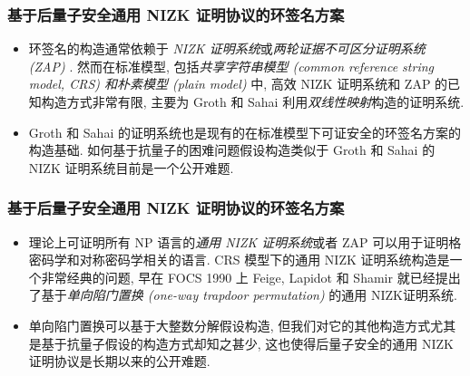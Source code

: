 \documentclass{beamer}
\begin{document}
\begin{frame}
    \frametitle{}

    \sectionpage

\end{frame}

\begin{frame}
    \frametitle{基于后量子安全通用 NIZK 证明协议的环签名方案}
    \begin{itemize}
        \item 环签名的构造通常依赖于 \emph{NIZK 证明系统}或\emph{两轮证据不可区分证明系统 (ZAP)} . 然而在标准模型, 包括\emph{共享字符串模型 (common reference string model, CRS) 和朴素模型 (plain model)} 中, 高效 NIZK 证明系统和 ZAP 的已知构造方式非常有限, 主要为 Groth 和 Sahai 利用\emph{双线性映射}构造的证明系统. 
        \item Groth 和 Sahai 的证明系统也是现有的在标准模型下可证安全的环签名方案的构造基础. 如何基于抗量子的困难问题假设构造类似于 Groth 和 Sahai 的 NIZK 证明系统目前是一个公开难题.
    \end{itemize}

    

\end{frame}

\begin{frame}
    \frametitle{基于后量子安全通用 NIZK 证明协议的环签名方案}
    \begin{itemize}
        \item 理论上可证明所有 NP 语言的\emph{通用 NIZK 证明系统}或者 ZAP 可以用于证明格密码学和对称密码学相关的语言. CRS 模型下的通用 NIZK 证明系统构造是一个非常经典的问题, 早在 FOCS 1990 上 Feige, Lapidot 和 Shamir  就已经提出了基于\emph{单向陷门置换 (one-way trapdoor permutation)} 的通用 NIZK证明系统. 
        \item 单向陷门置换可以基于大整数分解假设构造, 但我们对它的其他构造方式尤其是基于抗量子假设的构造方式却知之甚少, 这也使得后量子安全的通用 NIZK 证明协议是长期以来的公开难题. 
    \end{itemize}

    

\end{frame}
\end{document}
